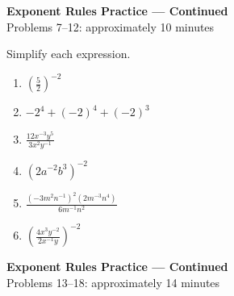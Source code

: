 \documentclass[12pt]{article}
\begin{document}
\newpage
\begin{center}
  {\large\textbf{Exponent Rules Practice --- Continued}}\\[2pt]
  Problems 7--12: approximately 10 minutes
\end{center}

Simplify each expression.
\begin{enumerate}[leftmargin=*,itemsep=0pt,resume]
  \item $\displaystyle\left(\frac{5}{2}\right)^{-2}$

  \item $-2^4+(-2)^4+(-2)^3$

  \item $\displaystyle\frac{12x^{-3}y^5}{3x^2y^{-1}}$

  \item $(2a^{-2}b^3)^{-2}$

  \item $\displaystyle
    \frac{(-3m^2n^{-1})^2(2m^{-3}n^4)}{6m^{-1}n^2}$

  \item $\displaystyle\left(\frac{4x^3y^{-2}}{2x^{-1}y}\right)^{-2}$
\end{enumerate}

\newpage
\begin{center}
  {\large\textbf{Exponent Rules Practice --- Continued}}\\[2pt]
  Problems 13--18: approximately 14 minutes
\end{center}
\end{document}
